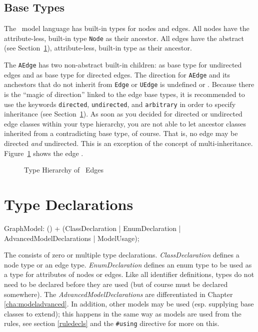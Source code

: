 \subsection{Base Types}
\label{sct:basetypes}
The \GrG\ model language has built-in types for nodes and edges.
All nodes have the attribute-less, built-in type \texttt{Node} as their ancestor.
All edges have the abstract (see Section~\ref{typedecl}), attribute-less, built-in type \texttt{} as their ancestor.

The \texttt{AEdge} has two non-abstract built-in children: \texttt{} as base type for undirected edges and \texttt{} as base type for directed edges.
The direction for \texttt{AEdge} and its anchestors that do not inherit from \texttt{Edge} or \texttt{UEdge} is undefined or .
Because there is the ``magic of direction'' linked to the edge base types, it is recommended to use the keywords \texttt{directed}, \texttt{undirected}, and \texttt{arbitrary} in order to specify inheritance (see Section~\ref{typedecl}).
As soon as you decided for directed or undirected edge classes within your type hierarchy, you are not able to let ancestor classes inherited from a contradicting base type, of course.
That is, no edge may be directed \emph{and} undirected.
This is an exception of the concept of multi-inheritance.
Figure~\ref{fig:basetypes} shows the edge .
\begin{figure}[htbp]
	\centering
	
	\caption{Type Hierarchy of \GrG\ Edges}
	\label{fig:basetypes}
\end{figure}


\section{Type Declarations}
\label{typedecl}

\begin{rail}
  GraphModel: () + (ClassDeclaration
  									 | EnumDeclaration
  									 | AdvancedModelDeclarations
  									 | ModelUsage);
\end{rail}
The  consists of zero or multiple type declarations.
\emph{ClassDeclaration} defines a node type or an edge type.
\emph{EnumDeclaration} defines an enum type to be used as a type for attributes of nodes or edges.
Like all identifier definitions, types do not need to be declared before they are used (but of course must be declared somewhere).
The \emph{AdvancedModelDeclarations} are differentiated in Chapter \ref{cha:modeladvanced}.
In addition, other models may be used (esp. supplying base classes to extend); this happens in the same way as models are used from the rules, see section \ref{ruledecls} and the \verb/#using/ directive for more on this.


